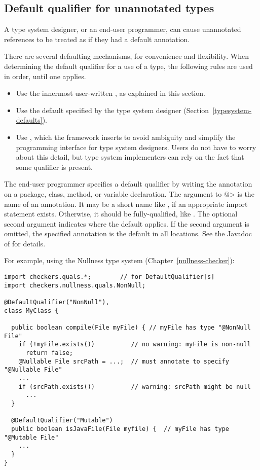 \subsection{Default qualifier for unannotated types\label{defaults}}

A type system designer, or an end-user programmer, can cause unannotated
references to be treated as if they had a default annotation.

There are several defaulting mechanisms, for convenience and flexibility.
When determining the default qualifier for a use of a type, the following
rules are used in order, until one applies.
\begin{itemize}
\item
  Use the innermost user-written , as explained in
  this section.
\item
  Use the default specified by the type system designer
  (Section~\ref{typesystem-defaults}).
\item
  Use , which the framework
  inserts to avoid ambiguity and simplify the programming interface for
  type system designers.  Users do not have to worry about this detail,
  but type system implementers can rely on the fact that some
  qualifier is present.
\end{itemize}



The end-user programmer specifies a default qualifier by writing the 
annotation on a package, class, method, or variable declaration.  The
argument to \<@> is the 
name of an annotation.  It may be a short name like , if an
appropriate import statement exists.  Otherwise, it should be
fully-qualified, like .
The optional second argument indicates where the default
applies.  If the second argument is omitted, the specified annotation is
the default in all locations.  See the Javadoc of  for details.

For example, using the Nullness type system (Chapter~\ref{nullness-checker}):

\begin{Verbatim}
import checkers.quals.*;        // for DefaultQualifier[s]
import checkers.nullness.quals.NonNull;

@DefaultQualifier("NonNull"),
class MyClass {

  public boolean compile(File myFile) { // myFile has type "@NonNull File"
    if (!myFile.exists())          // no warning: myFile is non-null
      return false;
    @Nullable File srcPath = ...;  // must annotate to specify "@Nullable File"
    ...
    if (srcPath.exists())          // warning: srcPath might be null
      ...
  }

  @DefaultQualifier("Mutable")
  public boolean isJavaFile(File myfile) {  // myFile has type "@Mutable File"
    ...
  }
}
\end{Verbatim}


